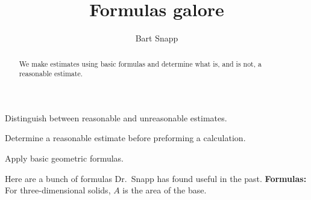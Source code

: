 \documentclass[handout,nooutcomes,noauthor,hints1,12pt]{ximera}
\title{Formulas galore}
\author{Bart Snapp}
\begin{document}
\begin{abstract}
We make estimates using basic formulas and determine what is, and is
not, a reasonable estimate.
\end{abstract}
\maketitle

\begin{listOutcomes}
\item Distinguish between reasonable and unreasonable estimates.
\item Determine a reasonable estimate before preforming a calculation.
\item Apply basic geometric formulas.
\end{listOutcomes}

Here are a bunch of formulas Dr.\ Snapp has found useful in the past. %
  \textbf{Formulas:} For three-dimensional solids, $A$ is the area of
  the base.
\end{document}
